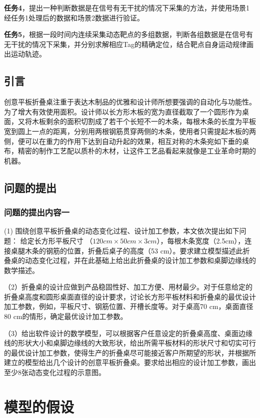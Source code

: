 \documentclass[bwprint]{gmcmthesis}
\begin{document}
\textbf{任务4}，提出一种判断数据是在信号有无干扰的情况下采集的方法，并使用场景1经任务1处理后的数据和场景2数据进行验证。

\textbf{任务5}，根据一段时间内连续采集动态靶点的多组数据，判断各组数据是在信号有无干扰的情况下采集，并分别求解相应Tag的精确定位，结合靶点自身运动规律画出运动轨迹。

\subsection{引言}
创意平板折叠桌注重于表达木制品的优雅和设计师所想要强调的自动化与功能性。为了增大有效使用面积。设计师以长方形木板的宽为直径截取了一个圆形作为桌面，又将木板剩余的面积切割成了若干个长短不一的木条，每根木条的长度为平板宽到圆上一点的距离，分别用两根钢筋贯穿两侧的木条，使用者只需提起木板的两侧，便可以在重力的作用下达到自动升起的效果，相互对称的木条宛如下垂的桌布，精密的制作工艺配以质朴的木材，让这件工艺品看起来就像是工业革命时期的机器。

\subsection{问题的提出}

\subsubsection{问题的提出内容一}

(1) 围绕创意平板折叠桌的动态变化过程、设计加工参数，本文依次提出如下问题：
给定长方形平板尺寸 （$120 cm \times 50 cm \times 3 cm$），每根木条宽度（2.5cm），连接桌腿木条的钢筋的位置，折叠后桌子的高度（53 cm）。要求建立模型描述此折叠桌的动态变化过程，并在此基础上给出此折叠桌的设计加工参数和桌脚边缘线的数学描述。

（2）折叠桌的设计应做到产品稳固性好、加工方便、用材最少。对于任意给定的折叠桌高度和圆形桌面直径的设计要求，讨论长方形平板材料和折叠桌的最优设计加工参数，例如，平板尺寸、钢筋位置、开槽长度等。对于桌高70 cm，桌面直径80 cm的情形，确定最优设计加工参数。

（3）给出软件设计的数学模型，可以根据客户任意设定的折叠桌高度、桌面边缘线的形状大小和桌脚边缘线的大致形状，给出所需平板材料的形状尺寸和切实可行的最优设计加工参数，使得生产的折叠桌尽可能接近客户所期望的形状，并根据所建立的模型给出几个设计的创意平板折叠桌。要求给出相应的设计加工参数，画出至少8张动态变化过程的示意图。

\section{模型的假设}
\end{document}
